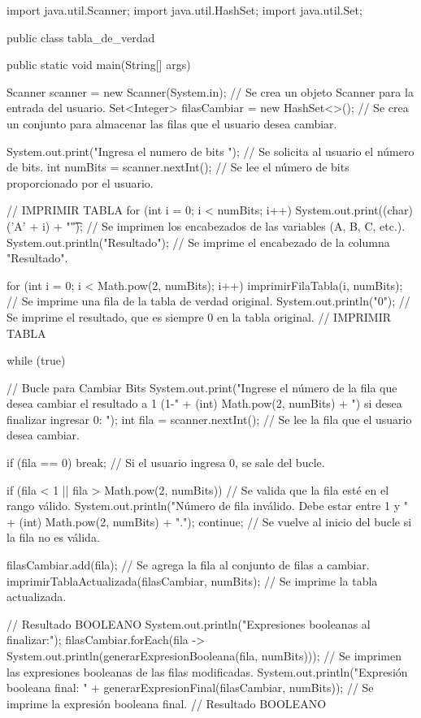 \begin{javaCode}
import java.util.Scanner;
import java.util.HashSet;
import java.util.Set;

public class tabla_de_verdad {
    public static void main(String[] args) {
        Scanner scanner = new Scanner(System.in);  // Se crea un objeto Scanner para la entrada del usuario.
        Set<Integer> filasCambiar = new HashSet<>();  // Se crea un conjunto para almacenar las filas que el usuario desea cambiar.

        System.out.print("Ingresa el numero de bits ");  // Se solicita al usuario el número de bits.
        int numBits = scanner.nextInt();  // Se lee el número de bits proporcionado por el usuario.

        // IMPRIMIR TABLA 
        for (int i = 0; i < numBits; i++) {
            System.out.print((char) ('A' + i) + "\t");  // Se imprimen los encabezados de las variables (A, B, C, etc.).
        }
        System.out.println("Resultado");  // Se imprime el encabezado de la columna "Resultado".

        for (int i = 0; i < Math.pow(2, numBits); i++) {
            imprimirFilaTabla(i, numBits);  // Se imprime una fila de la tabla de verdad original.
            System.out.println("0");  // Se imprime el resultado, que es siempre 0 en la tabla original.
        }
        // IMPRIMIR TABLA 

        while (true) {  // Bucle para Cambiar Bits
            System.out.print("Ingrese el número de la fila que desea cambiar el resultado a 1 (1-" + (int) Math.pow(2, numBits) + ") si desea finalizar ingresar 0: ");
            int fila = scanner.nextInt();  // Se lee la fila que el usuario desea cambiar.

            if (fila == 0) { break; }  // Si el usuario ingresa 0, se sale del bucle.

            if (fila < 1 || fila > Math.pow(2, numBits)) {  // Se valida que la fila esté en el rango válido.
                System.out.println("Número de fila inválido. Debe estar entre 1 y " + (int) Math.pow(2, numBits) + ".");
                continue;  // Se vuelve al inicio del bucle si la fila no es válida.
            }
            
            filasCambiar.add(fila);  // Se agrega la fila al conjunto de filas a cambiar.
            imprimirTablaActualizada(filasCambiar, numBits);  // Se imprime la tabla actualizada.
        }

        // Resultado BOOLEANO 
        System.out.println("Expresiones booleanas al finalizar:");
        filasCambiar.forEach(fila -> System.out.println(generarExpresionBooleana(fila, numBits)));  // Se imprimen las expresiones booleanas de las filas modificadas.
        System.out.println("Expresión booleana final: " + generarExpresionFinal(filasCambiar, numBits));  // Se imprime la expresión booleana final.
        // Resultado BOOLEANO 
    }

}
\end{javaCode}
